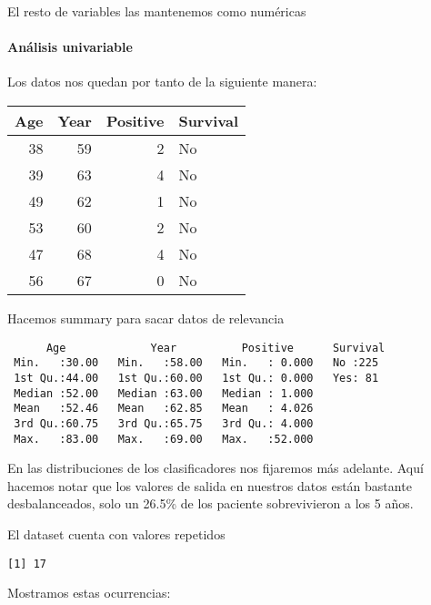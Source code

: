 \documentclass[
]{article}
\begin{document}
El resto de variables las mantenemos como numéricas

\hypertarget{anuxe1lisis-univariable}{%
\paragraph{Análisis univariable}\label{anuxe1lisis-univariable}}

Los datos nos quedan por tanto de la siguiente manera:

\begin{tabular}{r|r|r|l}
\hline
Age & Year & Positive & Survival\\
\hline
38 & 59 & 2 & No\\
\hline
39 & 63 & 4 & No\\
\hline
49 & 62 & 1 & No\\
\hline
53 & 60 & 2 & No\\
\hline
47 & 68 & 4 & No\\
\hline
56 & 67 & 0 & No\\
\hline
\end{tabular}

Hacemos summary para sacar datos de relevancia

\begin{verbatim}
      Age             Year          Positive      Survival 
 Min.   :30.00   Min.   :58.00   Min.   : 0.000   No :225  
 1st Qu.:44.00   1st Qu.:60.00   1st Qu.: 0.000   Yes: 81  
 Median :52.00   Median :63.00   Median : 1.000            
 Mean   :52.46   Mean   :62.85   Mean   : 4.026            
 3rd Qu.:60.75   3rd Qu.:65.75   3rd Qu.: 4.000            
 Max.   :83.00   Max.   :69.00   Max.   :52.000            
\end{verbatim}

En las distribuciones de los clasificadores nos fijaremos más adelante.
Aquí hacemos notar que los valores de salida en nuestros datos están
bastante desbalanceados, solo un 26.5\% de los paciente sobrevivieron a
los 5 años.

El dataset cuenta con valores repetidos

\begin{verbatim}
[1] 17
\end{verbatim}

Mostramos estas ocurrencias:
\end{document}
